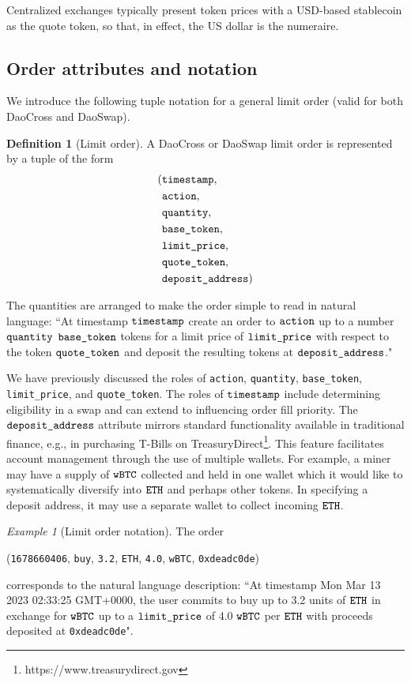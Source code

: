 \documentclass[11pt, reqno]{amsart}
\theoremstyle{definition}
\newtheorem{defn}{Definition}[subsection]
\theoremstyle{remark}
\newtheorem{exmp}{Example}[subsection]
\newcommand{\BTC}{\textnormal{\texttt{wBTC}}}
\newcommand{\ETH}{\textnormal{\texttt{ETH}}}
\newcommand{\timestamp}{\textnormal{\texttt{timestamp}}}
\newcommand{\action}{\textnormal{\texttt{action}}}
\newcommand{\quantity}{\textnormal{\texttt{quantity}}}
\newcommand{\basetoken}{\textnormal{\texttt{base\_token}}}
\newcommand{\limitprice}{\textnormal{\texttt{limit\_price}}}
\newcommand{\quotetoken}{\textnormal{\texttt{quote\_token}}}
\newcommand{\depositaddress}{\textnormal{\texttt{deposit\_address}}}
\newcommand{\buy}{\textnormal{\texttt{buy}}}
\begin{document}
Centralized exchanges typically present token prices with a USD-based stablecoin
as the quote token, so that, in effect, the US dollar is the numeraire.

\subsection{Order attributes and notation}
We introduce the following tuple notation for a general limit order
(valid for both DaoCross and DaoSwap).
\begin{defn}[Limit order]
A DaoCross or DaoSwap limit order is represented by a tuple of the form
\begin{align*}
( & \timestamp,       \\
  & \action,          \\
  & \quantity,        \\
  & \basetoken,       \\
  & \limitprice,      \\
  & \quotetoken,      \\
  & \depositaddress )
\end{align*}
\end{defn}

The quantities are arranged to make the order simple to read in natural
language:
``At timestamp $\timestamp$ create an order to $\action$ up to a number
$\quantity$ $\basetoken$ tokens for a limit price of $\limitprice$ with respect
to the token $\quotetoken$ and deposit the resulting tokens at
$\depositaddress$."

We have previously discussed the roles of \action, \quantity, \basetoken,
\limitprice, and \quotetoken.
The roles of $\timestamp$ include determining eligibility in a swap and can
extend to influencing order fill priority.
The $\depositaddress$ attribute mirrors standard functionality
available in traditional finance, e.g., in purchasing T-Bills on
TreasuryDirect\footnote{https://www.treasurydirect.gov}. This feature
facilitates account management through the use of multiple wallets. For
example, a miner may have a supply of $\BTC$ collected and held in one wallet
which it would like to systematically diversify into $\ETH$ and perhaps other
tokens. In specifying a deposit address, it may use a separate wallet to collect
incoming $\ETH$.

\begin{exmp}[Limit order notation]
The order
\begin{center}
(\textnormal{\texttt{1678660406}},
\buy,
\textnormal{\texttt{3.2}},
\ETH,
\textnormal{\texttt{4.0}},
\BTC,
\textnormal{\texttt{0xdeadc0de}})
\end{center}
corresponds to the natural language description:
``At timestamp Mon Mar 13 2023 02:33:25 GMT+0000, the user commits to buy up to
3.2 units of $\ETH$ in exchange for $\BTC$ up to a $\limitprice$ of 4.0
$\BTC$ per $\ETH$ with proceeds deposited at \textnormal{\texttt{0xdeadc0de}}".
\end{exmp}
\end{document}
